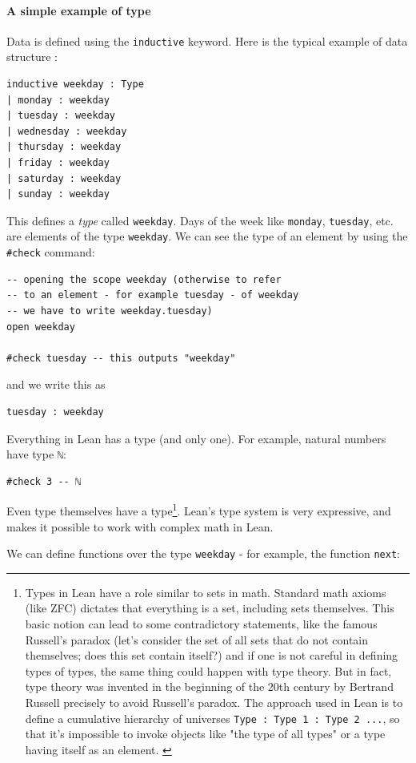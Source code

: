 \documentclass[oneside]{book}
\theoremstyle{definition}
\theoremstyle{remark}
\theoremstyle{plain}
\begin{document}
\paragraph{A simple example of type}
Data is defined using the \lstinline{inductive} keyword.
Here is the typical example of data structure \cite{theoremprovinglean}:
\begin{lstlisting}
inductive weekday : Type
| monday : weekday
| tuesday : weekday
| wednesday : weekday
| thursday : weekday
| friday : weekday
| saturday : weekday
| sunday : weekday
\end{lstlisting}
This defines a \textit{type} called \lstinline{weekday}.
Days of the week like \lstinline{monday}, \lstinline{tuesday}, etc. are elements of the type \lstinline{weekday}.
We can see the type of an element by using the \lstinline{#check} command:
\begin{lstlisting}
-- opening the scope weekday (otherwise to refer
-- to an element - for example tuesday - of weekday
-- we have to write weekday.tuesday)
open weekday

#check tuesday -- this outputs "weekday"
\end{lstlisting}
and we write this as
\begin{lstlisting}
tuesday : weekday
\end{lstlisting}
Everything in Lean has a type (and only one). For example, natural numbers have type \lstinline{ℕ}:
\begin{lstlisting}
#check 3 -- ℕ
\end{lstlisting}
Even type themselves have a type\footnote{Types in Lean have a role similar to sets in math.
Standard math axioms (like ZFC) dictates that everything is a set, including sets themselves.
This basic notion can lead to some contradictory statements, like the famous Russell's paradox
(let's consider the set of all sets that do not contain themselves; does this set contain itself?)
and if one is not careful in defining types of types, the same thing could happen with type theory.
But in fact, type theory was invented in the beginning of the 20th century by Bertrand Russell precisely to avoid Russell's paradox.
The approach used in Lean is to define a cumulative hierarchy of universes \lstinline{Type : Type 1 : Type 2 ...},
so that it's impossible to invoke objects like "the type of all types" or a type having itself as an element. \cite{CarneiroMaster}}.
Lean's type system is very expressive, and makes it possible to work with complex math in Lean.

We can define functions over the type \lstinline{weekday} -
for example, the function \lstinline{next}:
\end{document}
